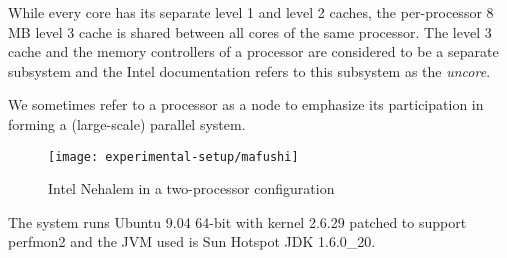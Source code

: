 While every core has its separate level 1 and level 2 caches, the
per-processor 8 MB level 3 cache is shared between all cores of the
same processor. The level 3 cache and the memory controllers of a
processor are considered to be a separate subsystem and the Intel
documentation refers to this subsystem as the \emph{uncore}.

We sometimes refer to a processor as a node to emphasize its
participation in forming a (large-scale) parallel system.

\begin{figure}[htb]
  \centering
  \texttt{[image: experimental-setup/mafushi]}
  \caption[Intel Nehalem in a two-processor configuration]{Intel
    Nehalem in a two-processor configuration}
  \label{fig:experimental-setup-mafushi}
\end{figure}

The system runs Ubuntu 9.04 64-bit with kernel 2.6.29 patched to
support perfmon2 \cite{Eranian2008} and the JVM used is Sun Hotspot
JDK 1.6.0\_20.


